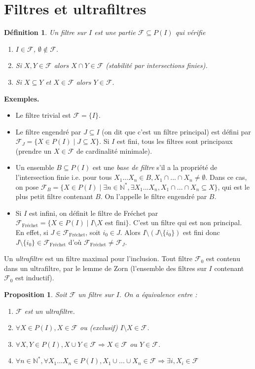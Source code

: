 \documentclass[11pt,a4paper]{report}
\newtheorem{defi}[theo]{Définition}
\newtheorem{prop}[theo]{Proposition}
\newcommand{\itemz}{\item[$\triangleright$]}
\newcommand{\F}{\mathcal{F}}
\newcommand{\gr}{\textbf}
\newcommand{\il}{\textit}
\newcommand{\N}{\mathbb{N}}
\newcommand{\1}{\mathbbm{1}}
\begin{document}
\section{Filtres et ultrafiltres}
\begin{defi}
Un filtre sur $I$ est une partie $\F \subseteq P(I)$ qui vérifie
\begin{enumerate}
\setlength\itemsep{-0.3em}
\item[(i)] $I \in \F$, $\emptyset \notin \F$.
\item[(ii)] Si $X,Y \in \F$ alors $X \cap Y \in \F$ (stabilité par intersections finies).
\item[(iii)] Si $X \subseteq Y$ et $X \in \F$ alors $Y \in \F$.
\end{enumerate}
\end{defi}

\gr{Exemples.} 
\begin{itemize}
\itemz Le filtre trivial est $\F = \{ I \}$.
\itemz Le filtre engendré par $J\subseteq I$ (on dit que c'est un filtre principal) est défini par $\F_J = \{ X \in P(I) \mid J \subseteq X \}$. Si $I$ est fini, tous les filtres sont principaux (prendre un $X \in \F$ de cardinalité minimale).
\itemz Un ensemble $B \subseteq P(I)$ est une \il{base de filtre} s'il a la propriété de l'intersection finie i.e. pour tous $X_1...X_n \in B, X_1 \cap ... \cap X_n \neq \emptyset$. Dans ce cas, on pose $\F_B = \{ X \in P(I) \mid \exists n \in \N^* , \exists X_1...X_n, X_1 \cap ... \cap X_n \subseteq X \}$, qui est le plus petit filtre contenant $B$. On l'appelle le filtre engendré par $B$.
\itemz Si $I$ est infini, on définit le filtre de Fréchet par $\F_\text{Fréchet} = \{ X \in P(I) \mid I\setminus X \text{ est fini}\}$. C'est un filtre qui est non principal. En effet, si $J \in \F_\text{Fréchet}$, soit $i_0 \in J$. Alors $I \setminus (J \setminus \{i_0\})$ est fini donc $J \setminus \{i_0\} \in \F_\text{Fréchet}$ d'où $\F_\text{Fréchet} \neq \F_J$.
\end{itemize}
Un \il{ultrafiltre} est un filtre maximal pour l'inclusion. Tout filtre $\F_0$ est contenu dans un ultrafiltre, par le lemme de Zorn (l'ensemble des filtres sur $I$ contenant $\F_0$ est inductif).
\begin{prop}
Soit $\F$ un filtre sur $I$. On a équivalence entre :
\begin{enumerate}
\setlength\itemsep{-0.3em}
\item[(i)] $\F$ est un ultrafiltre.
\item[(ii)] $\forall X \in P(I), X \in \F$ ou (exclusif) $I \setminus X \in \F$.
\item[(iii)] $\forall X,Y \in P(I), X \cup Y \in \F \Rightarrow X \in \F$ ou $Y \in \F$.
\item[(iv)] $\forall n \in \N^*, \forall X_1...X_n \in P(I), X_1 \cup ... \cup X_n \in \F \Rightarrow \exists i, X_i \in \F$
\end{enumerate}
\end{prop}
\end{document}
